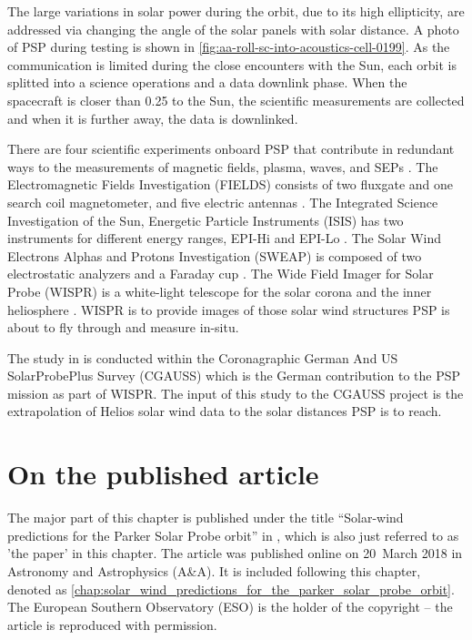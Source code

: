The large variations in solar power during the orbit, due to its high ellipticity, are addressed via changing the angle of the solar panels with solar distance. A photo of PSP during testing is shown in \autoref{fig:aa-roll-sc-into-acoustics-cell-0199}. As the communication is limited during the close encounters with the Sun, each orbit is splitted into a science operations and a data downlink phase. When the spacecraft is closer than \SI{0.25}{\au} to the Sun, the scientific measurements are collected and when it is further away, the data is downlinked.

There are four scientific experiments onboard PSP that contribute in redundant ways to the measurements of magnetic fields, plasma, waves, and SEPs \citep{Fox2015}.
The Electromagnetic Fields Investigation (FIELDS) consists of two fluxgate and one search coil magnetometer, and five electric antennas \citep{Bale2016}. %
The Integrated Science Investigation of the Sun, Energetic Particle Instruments (IS\sun{}IS) has two instruments for different energy ranges, EPI-Hi and EPI-Lo \citep{McComas2016}. %
The Solar Wind Electrons Alphas and Protons Investigation (SWEAP) is composed of two electrostatic analyzers and a Faraday cup \citep{Kasper2016}. %
The Wide Field Imager for Solar Probe (WISPR) is a white-light telescope for the solar corona and the inner heliosphere \citep{Vourlidas2016}. WISPR is to provide images of those solar wind structures PSP is about to fly through and measure in-situ. %

The study in \citet{Venzmer2018} is conducted within the Coronagraphic German And US SolarProbePlus Survey (CGAUSS) which is the German contribution to the PSP mission as part of WISPR. The input of this study to the CGAUSS project is the extrapolation of Helios solar wind data to the solar distances PSP is to reach.


\section{On the published article}
The major part of this chapter is published under the title ``Solar-wind predictions for the Parker Solar Probe orbit'' in \citet{Venzmer2018}, which is also just referred to as 'the paper' in this chapter. The article was published online on 20~March 2018 in Astronomy and Astrophysics (A\&A). It is included following this chapter, denoted as \autoref{chap:solar_wind_predictions_for_the_parker_solar_probe_orbit}. The European Southern Observatory (ESO) is the holder of the copyright -- the article is reproduced with permission.

